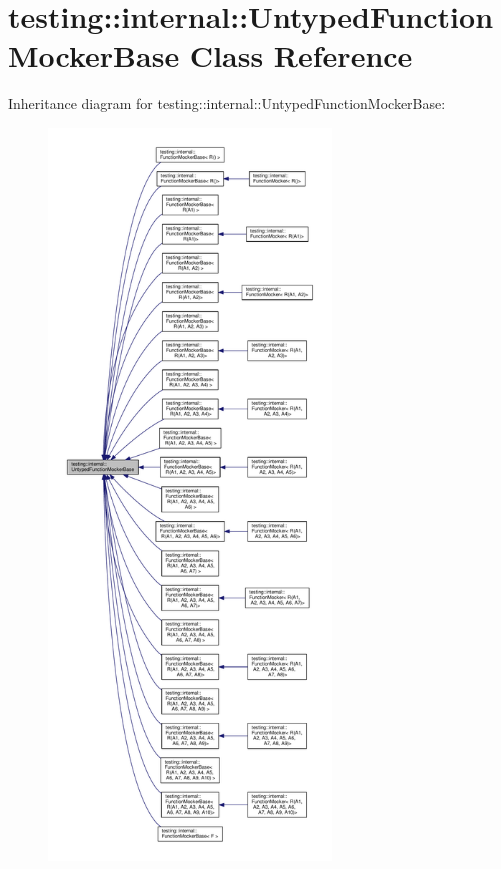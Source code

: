\hypertarget{classtesting_1_1internal_1_1_untyped_function_mocker_base}{}\section{testing\+:\+:internal\+:\+:Untyped\+Function\+Mocker\+Base Class Reference}
\label{classtesting_1_1internal_1_1_untyped_function_mocker_base}


Inheritance diagram for testing\+:\+:internal\+:\+:Untyped\+Function\+Mocker\+Base\+:
\nopagebreak
\begin{figure}[H]
\begin{center}
\leavevmode
\includegraphics[height=550pt]{classtesting_1_1internal_1_1_untyped_function_mocker_base__inherit__graph}
\end{center}
\end{figure}
